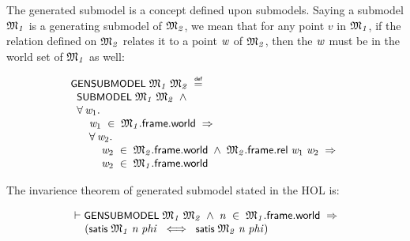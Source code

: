 \documentclass{report}
\renewcommand{\HOLConst}[1]{{\textsf{\upshape\small #1}}}
\renewcommand{\HOLinline}[1]{\ensuremath{#1}}
\newenvironment{holmath}{\begin{displaymath}\begin{array}{l}}{\end{array}\end{displaymath}\ignorespacesafterend}
\begin{document}
The generated submodel is a concept defined upon submodels. Saying a submodel \HOLinline{\HOLFreeVar{\ensuremath{\mathfrak{M}\sb{1}}}} is a generating submodel of \HOLinline{\HOLFreeVar{\ensuremath{\mathfrak{M}\sb{2}}}}, we mean that for any point $v$ in \HOLinline{\HOLFreeVar{\ensuremath{\mathfrak{M}\sb{1}}}}, if the relation defined on \HOLinline{\HOLFreeVar{\ensuremath{\mathfrak{M}\sb{2}}}} relates it to a point \HOLinline{\HOLFreeVar{w}} of \HOLinline{\HOLFreeVar{\ensuremath{\mathfrak{M}\sb{2}}}}, then the \HOLinline{\HOLFreeVar{w}} must be in the world set of \HOLinline{\HOLFreeVar{\ensuremath{\mathfrak{M}\sb{1}}}} as well:

\begin{holmath}
  \HOLConst{GENSUBMODEL}\;\HOLFreeVar{\ensuremath{\mathfrak{M}\sb{1}}}\;\HOLFreeVar{\ensuremath{\mathfrak{M}\sb{2}}}\;\HOLSymConst{\HOLTokenDefEquality{}}\\
\;\;\HOLConst{SUBMODEL}\;\HOLFreeVar{\ensuremath{\mathfrak{M}\sb{1}}}\;\HOLFreeVar{\ensuremath{\mathfrak{M}\sb{2}}}\;\HOLSymConst{\HOLTokenConj{}}\\
\;\;\HOLSymConst{\HOLTokenForall{}}\HOLBoundVar{w\sb{\mathrm{1}}}.\\
\;\;\;\;\;\;\HOLBoundVar{w\sb{\mathrm{1}}}\;\HOLSymConst{\HOLTokenIn{}}\;\HOLFreeVar{\ensuremath{\mathfrak{M}\sb{1}}}.\HOLFieldName{frame}.\HOLFieldName{world}\;\HOLSymConst{\HOLTokenImp{}}\\
\;\;\;\;\;\;\HOLSymConst{\HOLTokenForall{}}\HOLBoundVar{w\sb{\mathrm{2}}}.\\
\;\;\;\;\;\;\;\;\;\;\HOLBoundVar{w\sb{\mathrm{2}}}\;\HOLSymConst{\HOLTokenIn{}}\;\HOLFreeVar{\ensuremath{\mathfrak{M}\sb{2}}}.\HOLFieldName{frame}.\HOLFieldName{world}\;\HOLSymConst{\HOLTokenConj{}}\;\HOLFreeVar{\ensuremath{\mathfrak{M}\sb{2}}}.\HOLFieldName{frame}.\HOLFieldName{rel}\;\HOLBoundVar{w\sb{\mathrm{1}}}\;\HOLBoundVar{w\sb{\mathrm{2}}}\;\HOLSymConst{\HOLTokenImp{}}\\
\;\;\;\;\;\;\;\;\;\;\HOLBoundVar{w\sb{\mathrm{2}}}\;\HOLSymConst{\HOLTokenIn{}}\;\HOLFreeVar{\ensuremath{\mathfrak{M}\sb{1}}}.\HOLFieldName{frame}.\HOLFieldName{world}
\end{holmath}

The invarience theorem of generated submodel stated in the HOL is:

\begin{holmath}
  \ensuremath{\HOLTokenTurnstile}\HOLConst{GENSUBMODEL}\;\HOLFreeVar{\ensuremath{\mathfrak{M}\sb{1}}}\;\HOLFreeVar{\ensuremath{\mathfrak{M}\sb{2}}}\;\HOLSymConst{\HOLTokenConj{}}\;\HOLFreeVar{n}\;\HOLSymConst{\HOLTokenIn{}}\;\HOLFreeVar{\ensuremath{\mathfrak{M}\sb{1}}}.\HOLFieldName{frame}.\HOLFieldName{world}\;\HOLSymConst{\HOLTokenImp{}}\\
\;\;\;\;\;(\HOLConst{satis}\;\HOLFreeVar{\ensuremath{\mathfrak{M}\sb{1}}}\;\HOLFreeVar{n}\;\HOLFreeVar{phi}\;\HOLSymConst{\HOLTokenEquiv{}}\;\HOLConst{satis}\;\HOLFreeVar{\ensuremath{\mathfrak{M}\sb{2}}}\;\HOLFreeVar{n}\;\HOLFreeVar{phi})
\end{holmath}
\end{document}
